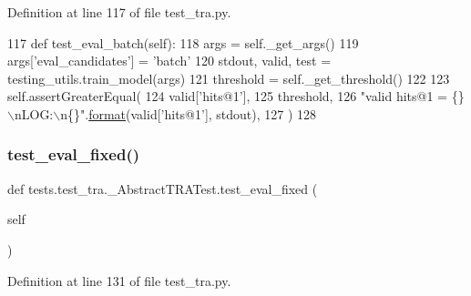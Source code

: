 Definition at line 117 of file test\+\_\+tra.\+py.


\begin{DoxyCode}
117     \textcolor{keyword}{def }test\_eval\_batch(self):
118         args = self.\_get\_args()
119         args[\textcolor{stringliteral}{'eval\_candidates'}] = \textcolor{stringliteral}{'batch'}
120         stdout, valid, test = testing\_utils.train\_model(args)
121         threshold = self.\_get\_threshold()
122 
123         self.assertGreaterEqual(
124             valid[\textcolor{stringliteral}{'hits@1'}],
125             threshold,
126             \textcolor{stringliteral}{"valid hits@1 = \{\}\(\backslash\)nLOG:\(\backslash\)n\{\}"}.\hyperlink{namespaceparlai_1_1chat__service_1_1services_1_1messenger_1_1shared__utils_a32e2e2022b824fbaf80c747160b52a76}{format}(valid[\textcolor{stringliteral}{'hits@1'}], stdout),
127         )
128 
\end{DoxyCode}
\mbox{\label{classtests_1_1test__tra_1_1__AbstractTRATest_a34bce944e4e602830f52995c2b42ac81}} 
\subsubsection{\texorpdfstring{test\+\_\+eval\+\_\+fixed()}{test\_eval\_fixed()}}
{\footnotesize\ttfamily def tests.\+test\+\_\+tra.\+\_\+\+Abstract\+T\+R\+A\+Test.\+test\+\_\+eval\+\_\+fixed (\begin{DoxyParamCaption}\item[{}]{self }\end{DoxyParamCaption})}



Definition at line 131 of file test\+\_\+tra.\+py.


